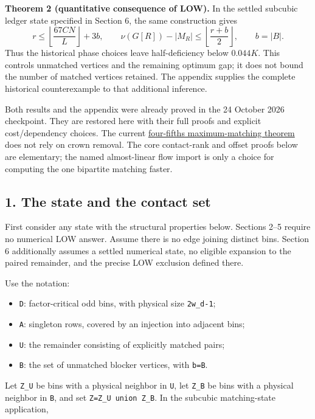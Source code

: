 \textbf{Theorem 2 (quantitative consequence of LOW).} In the settled subcubic ledger state specified in Section 6, the same construction gives \[
r\le\left\lfloor\frac{67CN}{L}\right\rfloor+3b,
\qquad
\nu(G[R])-|M_R|\le\left\lfloor\frac{r+b}{2}\right\rfloor,
\qquad b=|B|.
\] Thus the historical phase choices leave half-deficiency below \(0.044K\). This controls unmatched vertices and the remaining optimum gap; it does not bound the number of matched vertices retained. The appendix supplies the complete historical counterexample to that additional inference.

Both results and the appendix were already proved in the 24 October 2026 checkpoint. They are restored here with their full proofs and explicit cost/dependency choices. The current \href{https://github.com/icekylinx/algorithm-frontier/blob/main/problems/general-matching/proof.md}{four-fifths maximum-matching theorem} does not rely on crown removal. The core contact-rank and offset proofs below are elementary; the named almost-linear flow import is only a choice for computing the one bipartite matching faster.

\hypertarget{af-f687f276ee-the-state-and-the-contact-set}{%
\subsection{1. The state and the contact set}\label{af-f687f276ee-the-state-and-the-contact-set}}

First consider any state with the structural properties below. Sections 2--5 require no numerical LOW answer. Assume there is no edge joining distinct bins. Section 6 additionally assumes a settled numerical state, no eligible expansion to the paired remainder, and the precise LOW exclusion defined there.

Use the notation:

\begin{itemize}
\tightlist
\item
  \texttt{D}: factor-critical odd bins, with physical size \texttt{2w\_d-1};
\item
  \texttt{A}: singleton rows, covered by an injection into adjacent bins;
\item
  \texttt{U}: the remainder consisting of explicitly matched pairs;
\item
  \texttt{B}: the set of unmatched blocker vertices, with \texttt{b=\textbar{}B\textbar{}}.
\end{itemize}

Let \texttt{Z\_U} be bins with a physical neighbor in \texttt{U}, let \texttt{Z\_B} be bins with a physical neighbor in \texttt{B}, and set \texttt{Z=Z\_U\ union\ Z\_B}. In the subcubic matching-state application,

